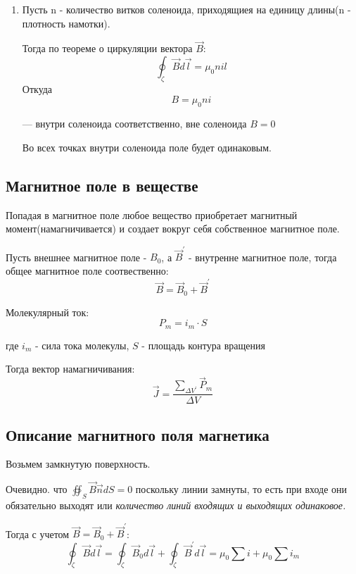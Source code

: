 \documentclass[../main.tex]{subfiles}
\begin{document}
\begin{enumerate}
    \item Пусть n - количество витков соленоида, приходящиея на единицу длины(n - плотность намотки).
    
    Тогда по теореме о циркуляции вектора $\vec B$:
    \[\oint_{\zeta} \vec B d \vec l = \mu_0 n i l\]
    Откуда 
    \[B = \mu_0 n i\]
    \begin{center}
        --- внутри соленоида соответственно, вне соленоида $B = 0$
    \end{center}
    Во всех точках внутри соленоида поле будет одинаковым.
\end{enumerate}

\subsection{Магнитное поле в веществе}
Попадая в магнитное поле любое вещество приобретает магнитный момент(намагничивается) и создает вокруг себя собственное магнитное поле. 

Пусть внешнее магнитное поле - $B_0$, а $\vec B^{\prime}$ - внутренне магнитное поле, тогда общее магнитное поле соотвественно: 
\[\vec B = \vec B_0 + \vec B^{\prime}\]

Молекулярный ток: 
\[P_m = i_m \cdot S\]
\begin{center}
    где $i_m$ - сила тока молекулы, $S$ - площадь контура вращения
\end{center}
Тогда вектор намагничивания: 
\[\vec J = \frac{\sum_{\Delta V^{\prime}} \vec P_m}{\Delta V}\]

\subsection{Описание магнитного поля магнетика}
Возьмем замкнутую поверхность. 

Очевидно. что $\oiint_{S} \vec B \vec n dS = 0$ поскольку линии замнуты, то есть при входе они обязательно выходят или \textit{количество линий входящих и выходящих одинаковое.}

Тогда с учетом $\vec B = \vec B_0 + \vec B^{\prime}$:
\[\oint_{\zeta} \vec B d \vec l = \oint_{\zeta} \vec B_0 d \vec l  + \oint_{\zeta} \vec B^{\prime} d \vec l = \mu_0 \sum i + \mu_0 \sum i_m \]
\end{document}
